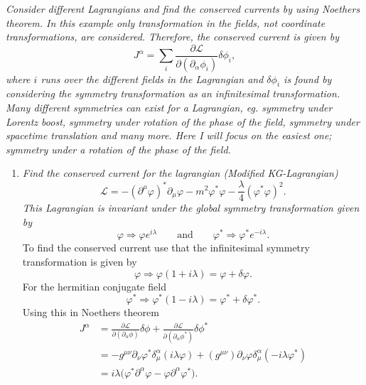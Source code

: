 \begin{example}
	\emph{Consider different Lagrangians and find the conserved currents by using Noethers theorem. In this example only transformation in the fields, not coordinate transformations, are considered. Therefore, the conserved current is given by}
	\begin{equation}
		J^\alpha=\sum_{i}\frac{\partial \mathcal{L}}{\partial (\partial_\alpha \phi_i)}\delta\phi_i,
	\end{equation} 
	\emph{where $i$ runs over the different fields in the Lagrangian and $\delta\phi_i$ is found by considering the symmetry transformation as an infinitesimal transformation. Many different symmetries can exist for a Lagrangian, eg. symmetry under Lorentz boost, symmetry under rotation of the phase of the field, symmetry under spacetime translation and many more. Here I will focus on the easiest one; symmetry under a rotation of the phase of the field.}\newline
	
	\begin{enumerate}
		\item \emph{Find the conserved current for the lagrangian (Modified KG-Lagrangian)}
		\begin{equation}
			\mathcal{L}=-(\partial^{\mu}\varphi)^*\partial_{\mu}\varphi-m^2\varphi^*\varphi-\frac{\lambda}{4}(\varphi^*\varphi)^2.
		\end{equation} 
		\emph{This Lagrangian is invariant under the global symmetry transformation given by}
		\begin{equation}
			\varphi\Rightarrow \varphi e^{i\lambda} \qquad \mbox{and} \qquad \varphi^*\Rightarrow \varphi^* e^{-i\lambda}.
		\end{equation} 
		To find the conserved current use that the infinitesimal symmetry transformation is given by
		\begin{equation}
			\varphi\Rightarrow \varphi(1+i\lambda)=\varphi+\delta\varphi.
		\end{equation} 
		For the hermitian conjugate field
		\begin{equation}
			\varphi^*\Rightarrow \varphi^*(1-i\lambda)=\varphi^*+\delta\varphi^*.
		\end{equation} 
		Using this in Noethers theorem
		\begin{equation}
			\begin{split}
				J^\alpha&=\frac{\partial \mathcal{L}}{\partial (\partial_\alpha \phi)}\delta\phi+\frac{\partial \mathcal{L}}{\partial (\partial_\alpha \phi^*)}\delta\phi^*\\
				&=-g^{\mu\nu}\partial_{\nu}\varphi^*\delta_\mu^\alpha(i\lambda\varphi)+(g^{\mu\nu})\partial_{\nu}\varphi\delta_\mu^\alpha(-i\lambda\varphi^*)\\
				&=i\lambda\bigg(\varphi^*\partial^{\alpha}\varphi-\varphi\partial^{\alpha}\varphi^*\bigg).\\
			\end{split}
		\end{equation} 
		

\end{enumerate}
\end{example}
